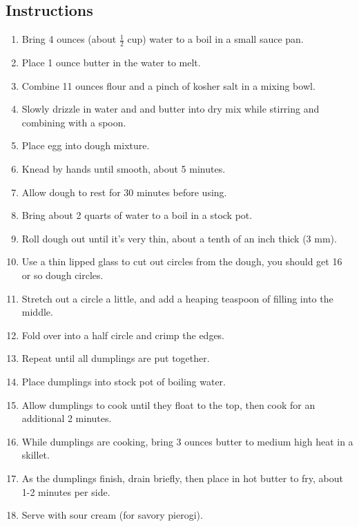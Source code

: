 \begin{multicols}{2}
\subsection*{Instructions}
\begin{enumerate}
    \item Bring 4 ounces (about \( \frac{1}{2} \) cup) water to a boil in a small sauce pan.
    \item Place 1 ounce butter in the water to melt.
    \item Combine 11 ounces flour and a pinch of kosher salt in a mixing bowl.
    \item Slowly drizzle in water and and butter into dry mix while stirring and combining with a spoon.
    \item Place egg into dough mixture.
    \item Knead by hands until smooth, about 5 minutes.
    \item Allow dough to rest for 30 minutes before using.
    \item Bring about 2 quarts of water to a boil in a stock pot.
    \item Roll dough out until it's very thin, about a tenth of an inch thick (3 mm).
    \item Use a thin lipped glass to cut out circles from the dough, you should get 16 or so dough circles.
    \item Stretch out a circle a little, and add a heaping teaspoon of filling into the middle.
    \item Fold over into a half circle and crimp the edges.
    \item Repeat until all dumplings are put together.
    \item Place dumplings into stock pot of boiling water.
    \item Allow dumplings to cook until they float to the top, then cook for an additional 2 minutes.
    \item While dumplings are cooking, bring 3 ounces butter to medium high heat in a skillet.
    \item As the dumplings finish, drain briefly, then place in hot butter to fry, about 1-2 minutes per side.
    \item Serve with sour cream (for savory pierogi).
\end{enumerate}


\end{multicols}

